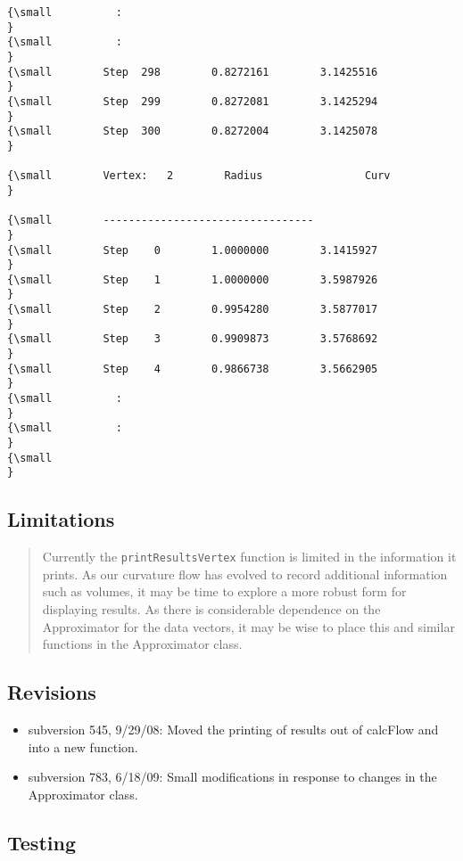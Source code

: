 \begin{verbatim}
{\small          : 
}
{\small          :
}
{\small        Step  298        0.8272161        3.1425516
}
{\small        Step  299        0.8272081        3.1425294
}
{\small        Step  300        0.8272004        3.1425078
}
 
{\small        Vertex:   2        Radius                Curv
}
 
{\small        ---------------------------------
}
{\small        Step    0        1.0000000        3.1415927
}
{\small        Step    1        1.0000000        3.5987926
}
{\small        Step    2        0.9954280        3.5877017
}
{\small        Step    3        0.9909873        3.5768692
}
{\small        Step    4        0.9866738        3.5662905
}
{\small          :
}
{\small          :
}
{\small   
}
\end{verbatim}

\subsection*{Limitations}

\begin{quotation}
Currently the \texttt{printResultsVertex} function is limited in the
information it prints. As our curvature flow has evolved to record
additional information such as volumes, it may be time to explore a more
robust form for displaying results. As there is considerable dependence on
the Approximator for the data vectors, it may be wise to place this and
similar functions in the Approximator class.
\end{quotation}

\subsection*{Revisions}

\begin{itemize}
\item subversion 545, 9/29/08: Moved the printing of results out of calcFlow
and into a new function.

\item subversion 783, 6/18/09: Small modifications in response to changes in
the Approximator class.
\end{itemize}

\subsection*{Testing}

